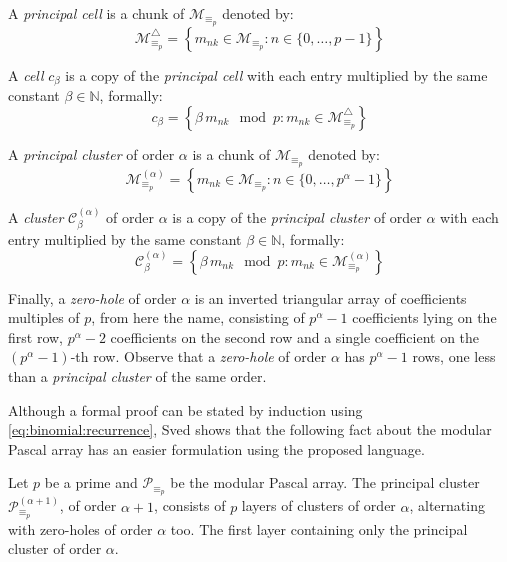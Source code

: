A \emph{principal cell} is a chunk of $\mathcal{M}_{\equiv_{p}}$ denoted by:
\begin{displaymath}
    \mathcal{M}_{\equiv_{p}}^{\bigtriangleup} = 
        \left\lbrace m_{nk}\in \mathcal{M}_{\equiv_{p}}: n\in\lbrace 0,\ldots,p-1\rbrace\right\rbrace
\end{displaymath}

A \emph{cell} $c_{\beta}$ is a copy of the \emph{principal cell} with each entry multiplied 
by the same constant $\beta\in\mathbb{N}$, formally:
\begin{displaymath}
    c_{\beta}=\left\lbrace \beta\,m_{nk}\mod p:m_{nk}\in \mathcal{M}_{\equiv_{p}}^{\bigtriangleup}\right\rbrace
\end{displaymath}

A \emph{principal cluster} of order $\alpha$ is a chunk of $\mathcal{M}_{\equiv_{p}}$ denoted by:
\begin{displaymath}
    \mathcal{M}_{\equiv_{p}}^{(\alpha)} = 
        \left\lbrace m_{nk}\in \mathcal{M}_{\equiv_{p}}: n\in\lbrace 0,\ldots,p^{\alpha}-1\rbrace\right\rbrace
\end{displaymath}

A \emph{cluster} $\mathcal{C}_{\beta}^{(\alpha)}$ of order $\alpha$ is a copy of the \emph{principal cluster}
of order $\alpha$ with each entry multiplied 
by the same constant $\beta\in\mathbb{N}$, formally:
\begin{displaymath}
    \mathcal{C}_{\beta}^{(\alpha)}=\left\lbrace \beta\,m_{nk}\mod p:m_{nk}\in \mathcal{M}_{\equiv_{p}}^{(\alpha)}\right\rbrace
\end{displaymath}

Finally, a \emph{zero-hole} of order $\alpha$ is an inverted triangular array of
coefficients multiples of $p$, from here the name, consisting of $p^{\alpha}-1$
coefficients lying on the first row, $p^{\alpha}-2$ coefficients on the second row
and a single coefficient on the $(p^{\alpha}-1)$-th row. 
Observe that a \emph{zero-hole} of order $\alpha$ has $p^{\alpha}-1$ rows, one less
than a \emph{principal cluster} of the same order.

Although a formal proof can be stated by induction using
\autoref{eq:binomial:recurrence}, Sved shows that the following fact 
about the modular Pascal array has an easier formulation using the proposed language.

\begin{theorem}
    Let $p$ be a prime and $\mathcal{P}_{\equiv_{p}}$ be the 
    modular Pascal array. The principal cluster $\mathcal{P}_{\equiv_{p}}^{(\alpha+1)}$,
    of order $\alpha + 1$, consists of $p$ layers of clusters of order $\alpha$, alternating
    with zero-holes of order $\alpha$ too. The first layer containing only the principal
    cluster of order $\alpha$.
\end{theorem}
